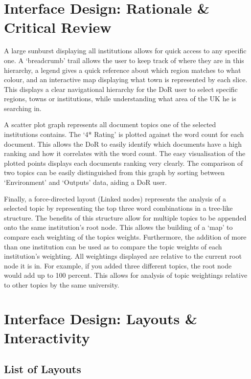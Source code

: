 \documentclass[a4paper, 11pt]{article}
\begin{document}
\newpage
\section{Interface Design: Rationale \& Critical Review}

A large sunburst displaying all institutions allows for quick access to any specific one. A `breadcrumb' trail allows the user to keep track of where they are in this hierarchy, a legend gives a quick reference about which region matches to what colour, and an interactive map displaying what town is represented by each slice. This displays a clear navigational hierarchy for the DoR user to select specific regions, towns or institutions, while understanding what area of the UK he is searching in. 

A scatter plot graph represents all document topics one of the selected institutions contains. The `4* Rating' is plotted against the word count for each document. This allows the DoR to easily identify which documents have a high ranking and how it correlates with the word count. The easy visualisation of the plotted points displays each documents ranking very clearly. The comparison of two topics can be easily distinguished from this graph by sorting between `Environment' and `Outputs' data, aiding a DoR user.

Finally, a force-directed layout (Linked nodes) represents the analysis of a selected topic by representing the top three word combinations in a tree-like structure. The benefits of this structure allow for multiple topics to be appended onto the same institution's root node. This allows the building of a `map' to compare each weighting of the topics weights. Furthermore, the addition of more than one institution can be used as to compare the topic weights of each institution's weighting. All weightings displayed are relative to the current root node it is in. For example, if you added three different topics, the root node would add up to 100 percent. This allows for analysis of topic weightings relative to other topics by the same university.


\section{Interface Design: Layouts \& Interactivity}
\subsection{List of Layouts}
\end{document}
